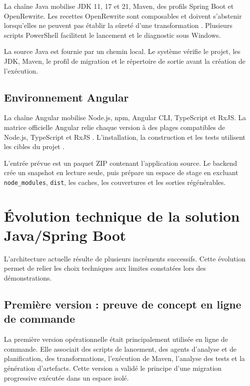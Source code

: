 La chaîne Java mobilise JDK 11, 17 et 21, Maven, des profils Spring Boot et OpenRewrite. Les recettes OpenRewrite sont composables et doivent s'abstenir lorsqu'elles ne peuvent pas établir la sûreté d'une transformation \cite{openrewrite-recipes,openrewrite-best-practices}. Plusieurs scripts PowerShell facilitent le lancement et le diagnostic sous Windows.

La source Java est fournie par un chemin local. Le système vérifie le projet, les JDK, Maven, le profil de migration et le répertoire de sortie avant la création de l'exécution.

\subsection{Environnement Angular}

La chaîne Angular mobilise Node.js, npm, Angular CLI, TypeScript et RxJS. La matrice officielle Angular relie chaque version à des plages compatibles de Node.js, TypeScript et RxJS \cite{angular-versions}. L'installation, la construction et les tests utilisent les cibles du projet \cite{angular-cli-build,angular-cli-test}.

L'entrée prévue est un paquet ZIP contenant l'application source. Le backend crée un snapshot en lecture seule, puis prépare un espace de stage en excluant \texttt{node\_modules}, \texttt{dist}, les caches, les couvertures et les sorties régénérables.

\section{Évolution technique de la solution Java/Spring Boot}

L'architecture actuelle résulte de plusieurs incréments successifs. Cette évolution permet de relier les choix techniques aux limites constatées lors des démonstrations.

\subsection{Première version : preuve de concept en ligne de commande}

La première version opérationnelle était principalement utilisée en ligne de commande. Elle associait des scripts de lancement, des agents d'analyse et de planification, des transformations, l'exécution de Maven, l'analyse des tests et la génération d'artefacts. Cette version a validé le principe d'une migration progressive exécutée dans un espace isolé.

